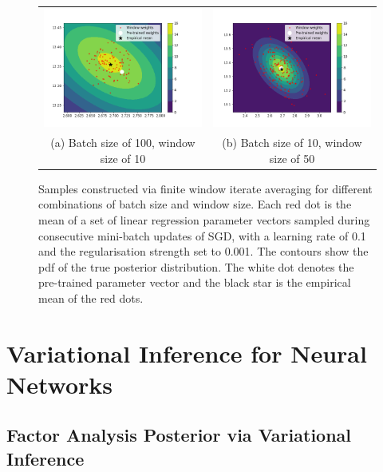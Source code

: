 \documentclass[msc,deptreport.inf]{infthesis} %
\begin{document}
\begin{figure}[!htbp] 
	\begin{tabular}{cc}
		 \includegraphics[width=70mm]{plots/linear_model_average_weight_iterates__lr=0.1__lambda=0.001__batch_size=100__window_size=10.png}
		 & \includegraphics[width=70mm]{plots/linear_model_average_weight_iterates__lr=0.1__lambda=0.001__batch_size=10__window_size=50.png} \\
		 (a) Batch size of 100, window size of 10
		 & (b) Batch size of 10, window size of 50 \\[6pt]
	\end{tabular}
	\caption{Samples constructed via finite window iterate averaging for different combinations of batch size and window size. Each red dot is the mean of a set of linear regression parameter vectors sampled during consecutive mini-batch updates of SGD, with a learning rate of 0.1 and the regularisation strength set to 0.001. The contours show the pdf of the true posterior distribution. The white dot denotes the pre-trained parameter vector and the black star is the empirical mean of the red dots.}
	\label{fig:linear_regression_average_iterates}
\end{figure}


\chapter{Variational Inference for Neural Networks}

\section{Factor Analysis Posterior via Variational Inference}
\end{document}

